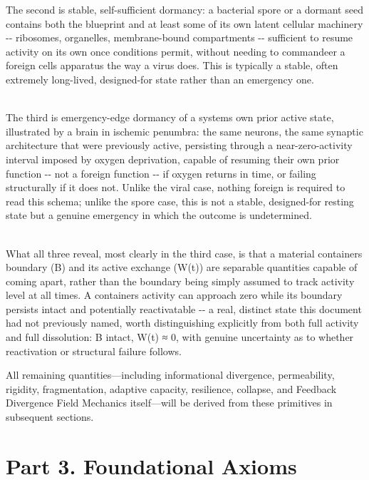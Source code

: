 \documentclass[
]{article}
\begin{document}
The second is stable, self-sufficient dormancy: a bacterial spore or a
dormant seed contains both the blueprint and at least some of its own
latent cellular machinery -\/- ribosomes, organelles, membrane-bound
compartments -\/- sufficient to resume activity on its own once
conditions permit, without needing to commandeer a foreign
cell\textquotesingle s apparatus the way a virus does. This is typically
a stable, often extremely long-lived, designed-for state rather than an
emergency one.\\
\strut \\
The third is emergency-edge dormancy of a system\textquotesingle s own
prior active state, illustrated by a brain in ischemic penumbra: the
same neurons, the same synaptic architecture that were previously
active, persisting through a near-zero-activity interval imposed by
oxygen deprivation, capable of resuming their own prior function -\/-
not a foreign function -\/- if oxygen returns in time, or failing
structurally if it does not. Unlike the viral case, nothing foreign is
required to read this schema; unlike the spore case, this is not a
stable, designed-for resting state but a genuine emergency in which the
outcome is undetermined.\\
\strut \\
What all three reveal, most clearly in the third case, is that a
material container\textquotesingle s boundary (B) and its active
exchange (W(t)) are separable quantities capable of coming apart, rather
than the boundary being simply assumed to track activity level at all
times. A container\textquotesingle s activity can approach zero while
its boundary persists intact and potentially reactivatable -\/- a real,
distinct state this document had not previously named, worth
distinguishing explicitly from both full activity and full dissolution:
B intact, W(t) ≈ 0, with genuine uncertainty as to whether reactivation
or structural failure follows.

All remaining quantities---including informational divergence,
permeability, rigidity, fragmentation, adaptive capacity, resilience,
collapse, and Feedback Divergence Field Mechanics itself---will be
derived from these primitives in subsequent sections.

\hypertarget{part-3.-foundational-axioms}{%
\section{Part 3. Foundational
Axioms}\label{part-3.-foundational-axioms}}
\end{document}
